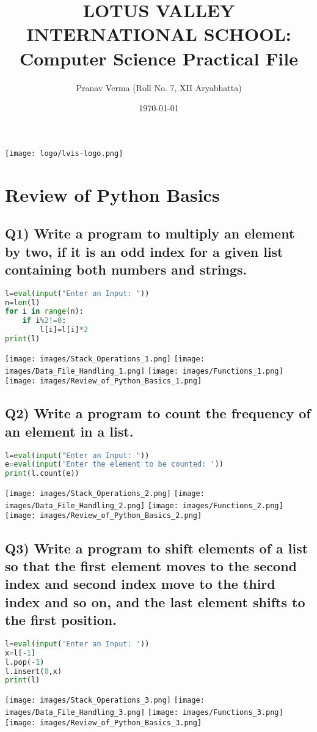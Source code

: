 \documentclass{article}
\title{LOTUS VALLEY INTERNATIONAL SCHOOL: Computer Science Practical File}
\author{Pranav Verma (Roll No. 7, XII Aryabhatta)}
\date{\today}
\begin{document}
\maketitle

\begin{center}
\texttt{[image: logo/lvis-logo.png]}
\end{center}

\vspace*{\fill}

\tableofcontents

\section{Review of Python Basics}

\subsection*{Q1) Write a program to multiply an element by two, if it is an odd index for a given list containing both numbers and strings.}
\begin{lstlisting}[language=Python]
l=eval(input("Enter an Input: "))
n=len(l)
for i in range(n):
    if i%2!=0:
        l[i]=l[i]*2
print(l)
\end{lstlisting}
\texttt{[image: images/Stack\_Operations\_1.png]}
\texttt{[image: images/Data\_File\_Handling\_1.png]}
\texttt{[image: images/Functions\_1.png]}
\texttt{[image: images/Review\_of\_Python\_Basics\_1.png]}

\subsection*{Q2) Write a program to count the frequency of an element in a list.}
\begin{lstlisting}[language=Python]
l=eval(input("Enter an Input: "))
e=eval(input('Enter the element to be counted: '))
print(l.count(e))
\end{lstlisting}
\texttt{[image: images/Stack\_Operations\_2.png]}
\texttt{[image: images/Data\_File\_Handling\_2.png]}
\texttt{[image: images/Functions\_2.png]}
\texttt{[image: images/Review\_of\_Python\_Basics\_2.png]}

\subsection*{Q3) Write a program to shift elements of a list so that the first element moves to the second index and second index move to the third index and so on, and the last element shifts to the first position.}
\begin{lstlisting}[language=Python]
l=eval(input('Enter an Input: '))
x=l[-1]
l.pop(-1)
l.insert(0,x)
print(l)
\end{lstlisting}
\texttt{[image: images/Stack\_Operations\_3.png]}
\texttt{[image: images/Data\_File\_Handling\_3.png]}
\texttt{[image: images/Functions\_3.png]}
\texttt{[image: images/Review\_of\_Python\_Basics\_3.png]}
\end{document}
